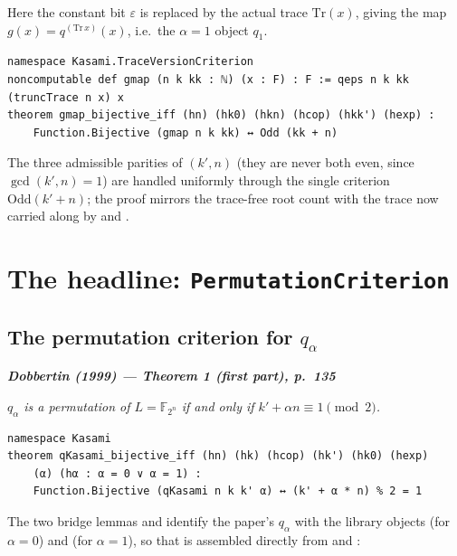 \documentclass[11pt]{article}
\newenvironment{paperquote}[1]
 {\par\smallskip\noindent
  \def\FrameCommand{\color{quotebar}\vrule width 3pt\hspace{8pt}}%
  \MakeFramed{\advance\hsize-\width \FrameRestore}%
  \small\itshape
  \noindent\normalfont\footnotesize\textbf{\textsf{Dobbertin (1999) --- #1}}\par\nobreak\smallskip\itshape}
 {\endMakeFramed\par\smallskip}
\theoremstyle{definition}
\begin{document}
Here the constant bit $\varepsilon$ is replaced by the actual trace $\mathrm{Tr}(x)$,
giving the map $g(x)=q^{(\mathrm{Tr}\,x)}(x)$, i.e.\ the $\alpha=1$ object $q_1$.

\begin{lstlisting}
namespace Kasami.TraceVersionCriterion
noncomputable def gmap (n k kk : ℕ) (x : F) : F := qeps n k kk (truncTrace n x) x
theorem gmap_bijective_iff (hn) (hk0) (hkn) (hcop) (hkk') (hexp) :
    Function.Bijective (gmap n k kk) ↔ Odd (kk + n)
\end{lstlisting}

The three admissible parities of $(k',n)$ (they are never both even, since
$\gcd(k',n)=1$) are handled uniformly through the single criterion
$\mathrm{Odd}(k'+n)$; the proof mirrors the trace-free root count with the trace
now carried along by  and .

\section{The headline: \texttt{PermutationCriterion}}

\subsection{The permutation criterion for $q_\alpha$}

\begin{paperquote}{Theorem 1 (first part), p.~135}
$q_\alpha$ is a permutation of $L=\mathbb F_{2^n}$ if and only if
$k'+\alpha n\equiv 1\pmod 2$.
\end{paperquote}

\begin{lstlisting}
namespace Kasami
theorem qKasami_bijective_iff (hn) (hk) (hcop) (hk') (hk0) (hexp)
    (α) (hα : α = 0 ∨ α = 1) :
    Function.Bijective (qKasami n k k' α) ↔ (k' + α * n) % 2 = 1
\end{lstlisting}

The two bridge lemmas  and 
identify the paper's $q_\alpha$ with the library objects  (for
$\alpha=0$) and  (for $\alpha=1$), so that
 is assembled directly from 
and :

\begin{center}
\end{center}
\end{document}
